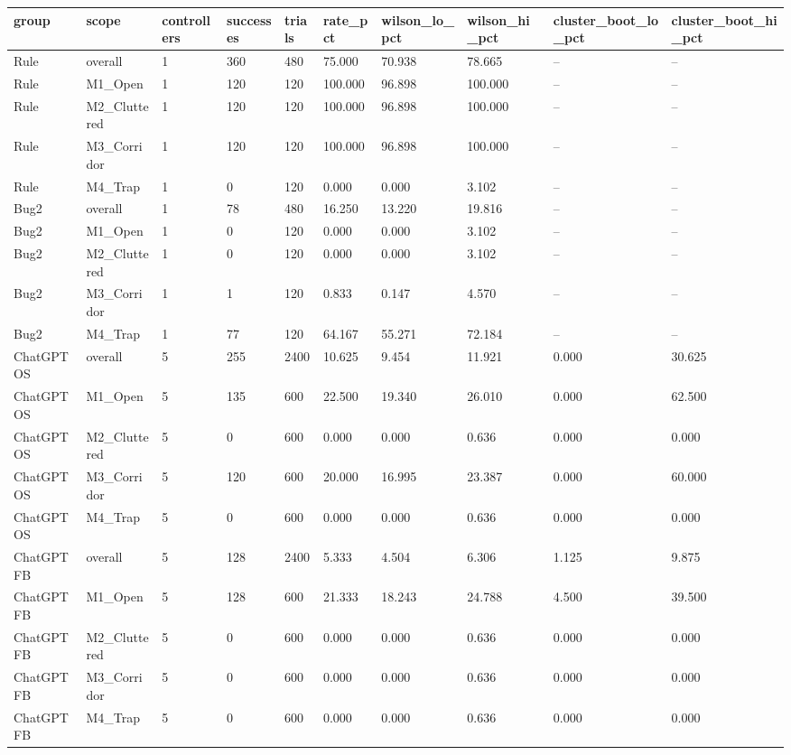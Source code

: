 \begin{tabular}{llllllllll}
\hline
group & scope & controllers & successes & trials & rate\_pct & wilson\_lo\_pct & wilson\_hi\_pct & cluster\_boot\_lo\_pct & cluster\_boot\_hi\_pct \\
\hline
Rule & overall & 1 & 360 & 480 & 75.000 & 70.938 & 78.665 & -- & -- \\
Rule & M1\_Open & 1 & 120 & 120 & 100.000 & 96.898 & 100.000 & -- & -- \\
Rule & M2\_Cluttered & 1 & 120 & 120 & 100.000 & 96.898 & 100.000 & -- & -- \\
Rule & M3\_Corridor & 1 & 120 & 120 & 100.000 & 96.898 & 100.000 & -- & -- \\
Rule & M4\_Trap & 1 & 0 & 120 & 0.000 & 0.000 & 3.102 & -- & -- \\
Bug2 & overall & 1 & 78 & 480 & 16.250 & 13.220 & 19.816 & -- & -- \\
Bug2 & M1\_Open & 1 & 0 & 120 & 0.000 & 0.000 & 3.102 & -- & -- \\
Bug2 & M2\_Cluttered & 1 & 0 & 120 & 0.000 & 0.000 & 3.102 & -- & -- \\
Bug2 & M3\_Corridor & 1 & 1 & 120 & 0.833 & 0.147 & 4.570 & -- & -- \\
Bug2 & M4\_Trap & 1 & 77 & 120 & 64.167 & 55.271 & 72.184 & -- & -- \\
ChatGPT OS & overall & 5 & 255 & 2400 & 10.625 & 9.454 & 11.921 & 0.000 & 30.625 \\
ChatGPT OS & M1\_Open & 5 & 135 & 600 & 22.500 & 19.340 & 26.010 & 0.000 & 62.500 \\
ChatGPT OS & M2\_Cluttered & 5 & 0 & 600 & 0.000 & 0.000 & 0.636 & 0.000 & 0.000 \\
ChatGPT OS & M3\_Corridor & 5 & 120 & 600 & 20.000 & 16.995 & 23.387 & 0.000 & 60.000 \\
ChatGPT OS & M4\_Trap & 5 & 0 & 600 & 0.000 & 0.000 & 0.636 & 0.000 & 0.000 \\
ChatGPT FB & overall & 5 & 128 & 2400 & 5.333 & 4.504 & 6.306 & 1.125 & 9.875 \\
ChatGPT FB & M1\_Open & 5 & 128 & 600 & 21.333 & 18.243 & 24.788 & 4.500 & 39.500 \\
ChatGPT FB & M2\_Cluttered & 5 & 0 & 600 & 0.000 & 0.000 & 0.636 & 0.000 & 0.000 \\
ChatGPT FB & M3\_Corridor & 5 & 0 & 600 & 0.000 & 0.000 & 0.636 & 0.000 & 0.000 \\
ChatGPT FB & M4\_Trap & 5 & 0 & 600 & 0.000 & 0.000 & 0.636 & 0.000 & 0.000 \\

\end{tabular}
